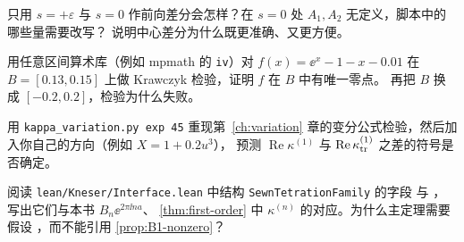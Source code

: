 \begin{exercise}\label{ch11:ex:one-sided}
只用 $s=+\varepsilon$ 与 $s=0$ 作前向差分会怎样？在 $s=0$ 处 $A_1,A_2$ 无定义，脚本中的哪些量需要改写？
说明中心差分为什么既更准确、又更方便。
\end{exercise}

\begin{exercise}\label{ch11:ex:krawczyk}
用任意区间算术库（例如 mpmath 的 \texttt{iv}）对 $f(x)=\ee^x-1-x-0.01$ 在 $B=[0.13,0.15]$ 上做 Krawczyk 检验，证明 $f$ 在 $B$ 中有唯一零点。
再把 $B$ 换成 $[-0.2,0.2]$，检验为什么失败。
\end{exercise}

\begin{exercise}\label{ch11:ex:variation-check}
用 \texttt{kappa\_\allowbreak{}variation.py exp 45} 重现第~\ref{ch:variation} 章的变分公式检验，然后加入你自己的方向（例如 $X=1+0.2u^3$），
预测 $\operatorname{Re}\kappa^{(1)}$ 与 $\operatorname{Re}\kappa_{\mathrm{tr}}^{(1)}$ 之差的符号是否确定。
\end{exercise}

\begin{exercise}\label{ch11:ex:lean}
阅读 \texttt{lean/Kneser/Interface.lean} 中结构 \texttt{SewnTetrationFamily} 的字段  与 ，写出它们与本书 $B_n\ee^{2\pi\ii na}$、
\cref{thm:first-order} 中 $\kappa^{(n)}$ 的对应。为什么主定理需要假设 ，而不能引用 \cref{prop:B1-nonzero}？
\end{exercise}
